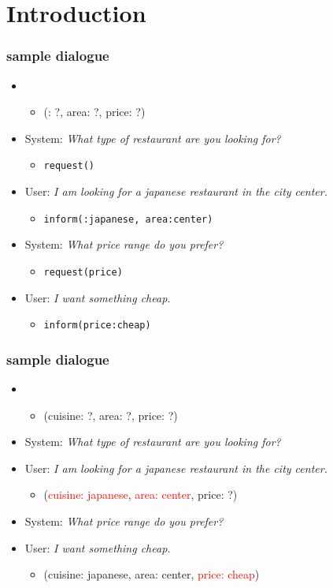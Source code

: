 \section{Introduction}

\begin{frame}
\frametitle{sample dialogue}
\begin{itemize}
\item[] 
\begin{itemize}
\item[] (: ?, area: ?, price: ?)
\end{itemize}
\item[] System: \textit{What type of restaurant are you looking for?}
\begin{itemize}
\item[] \texttt{request()}
\end{itemize}
\item[] User: \textit{I am looking for a japanese restaurant in the city center.}
\begin{itemize}
\item[] \texttt{inform(:japanese, area:center)}
\end{itemize}
\item[] System: \textit{What price range do you prefer?}
\begin{itemize}
\item[] \texttt{request(price)}
\end{itemize}
\item[] User: \textit{I want something cheap.}
\begin{itemize}
\item[] \texttt{inform(price:cheap)}
\end{itemize}
\end{itemize}
\end{frame}

\begin{frame}
\frametitle{sample dialogue}
\begin{itemize}
\item[] 
\begin{itemize}
\item[] (cuisine: ?, area: ?, price: ?)
\end{itemize}
\item[] System: \textit{What type of restaurant are you looking for?}
\item[] User: \textit{I am looking for a japanese restaurant in the city center.}
\begin{itemize}
\item[] (\textcolor{red}{cuisine: japanese}, \textcolor{red}{area: center}, price: ?)
\end{itemize}
\item[] System: \textit{What price range do you prefer?}
\item[] User: \textit{I want something cheap.}
\begin{itemize}
\item[] (cuisine: japanese, area: center, \textcolor{red}{price: cheap})
\end{itemize}
\end{itemize}
\end{frame}

